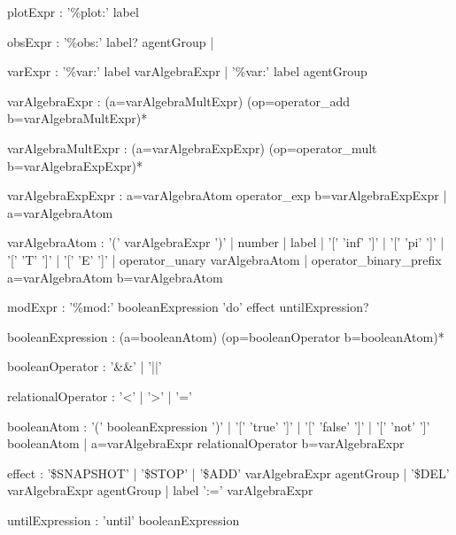 \begin{bnfsource}




plotExpr :
  '\%plot:' label

obsExpr :
  '\%obs:' label? agentGroup
  | 

varExpr :
  '\%var:' label varAlgebraExpr
  | '\%var:' label agentGroup

varAlgebraExpr :
  (a=varAlgebraMultExpr) (op=operator_add b=varAlgebraMultExpr)*
  
varAlgebraMultExpr :
  (a=varAlgebraExpExpr) (op=operator_mult b=varAlgebraExpExpr)*
  
varAlgebraExpExpr :
  a=varAlgebraAtom operator_exp b=varAlgebraExpExpr
  | a=varAlgebraAtom
  
varAlgebraAtom :
  '(' varAlgebraExpr ')'
  | number
  | label
  | '[' 'inf' ']'
  | '[' 'pi' ']'
  | '[' 'T' ']'
  | '[' 'E' ']'
  | operator_unary varAlgebraAtom
  | operator_binary_prefix a=varAlgebraAtom b=varAlgebraAtom
  
modExpr :
  '\%mod:' booleanExpression 'do' effect untilExpression?
  

booleanExpression :
  (a=booleanAtom) (op=booleanOperator b=booleanAtom)*
  
booleanOperator :
  '&&' | '||'

relationalOperator :
  '<' | '>' | '='

  
booleanAtom :
  '(' booleanExpression ')'
  | '[' 'true' ']'
  | '[' 'false' ']'
  | '[' 'not' ']' booleanAtom
  | a=varAlgebraExpr relationalOperator b=varAlgebraExpr

effect :
  '\$SNAPSHOT'
  | '\$STOP'
  | '\$ADD' varAlgebraExpr agentGroup
  | '\$DEL' varAlgebraExpr agentGroup
  | label ':=' varAlgebraExpr
  
untilExpression :
  'until' booleanExpression
  
  
  

\end{bnfsource}
